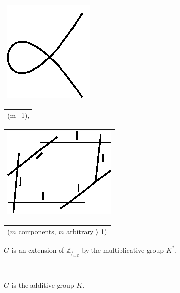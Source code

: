 \medskip
\begin{case*}[$(b_m)$ ]~

\noindent
\begin{tabular}{l}
{\includegraphics{vol37-figures/fig37-2.eps}}
\end{tabular}
\begin{tabular}[m]{l}
{(m=1),} 
\end{tabular}
\begin{tabular}{l}
{\includegraphics{vol37-figures/fig37-2(1).eps}}
\end{tabular}
\begin{tabular}{>{\raggedright}p{3cm}}
{($m$ components,  $m$ arbitrary $\rangle$ 1)}  
\end{tabular}

\medskip

  $G$ is an extension of $ \mathbb{Z}_{/_{m \mathbb {Z} }}$  by the
  multiplicative group $K^*$. 
\end{case*}

\begin{case*}[$(C ~1)$ ]~

\begin{minipage}{4cm}
  \begin{figure}[H]
  \end{figure}
\end{minipage}\qquad 
\begin{minipage}{4cm}
 $G$ is the additive group $K$.
\end{minipage}
\end{case*}

